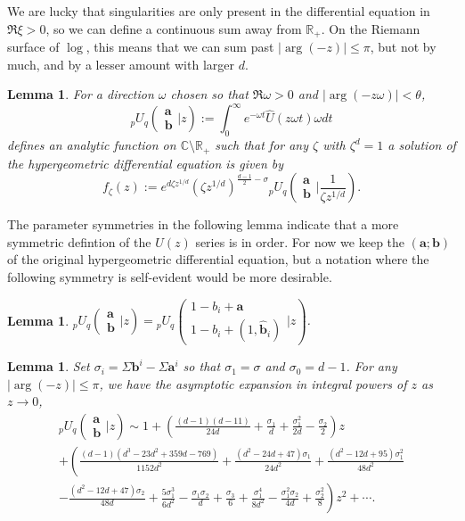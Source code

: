 \documentclass[12pt]{article}
\newcommand{\ee}[0] {e}
\numberwithin{equation}{section}
\newtheorem{lemma}[theorem]{Lemma}
\newcommand{\FF}[6] {{}_{#1}{#2}_{#3} \left( \begin{array}{c} #4 \\ #5 \end{array} \Big| #6  \right)}
\newcommand{\bfa}[0] {\mathbf{a}}
\newcommand{\bfb}[0] {\mathbf{b}}
\begin{document}
We are lucky that singularities are only present in the differential equation in $\Re \xi > 0$, so we can define a continuous sum away from $\mathbb{R}_{+}$. On the Riemann surface of $\log$, this means that we can sum past $|\arg(-z)|\le \pi$, but not by much, and by a lesser amount with larger $d$.

\begin{lemma}
\label{pUq_def}
For a direction $\omega$ chosen so that $\Re \omega > 0$ and $|\arg(-z \omega)| < \theta$,
\begin{equation*}
\FF{p}{U}{q}{\bfa}{\bfb}{z} := \int_{0}^{\infty} \ee^{-\omega t} \hat{U}(z \omega t) \omega dt
\end{equation*}
defines an analytic function on $\mathbb{C} \setminus \mathbb{R}_{+}$ such that for any $\zeta$ with $\zeta^d=1$ a solution of the hypergeometric differential equation is given by
\begin{equation*}
f_{\zeta}(z) := \ee^{d \zeta z^{1/d}} (\zeta z^{1/d})^{\frac{d-1}{2}-\sigma} \FF{p}{U}{q}{\bfa}{\bfb}{\frac{1}{\zeta z^{1/d}}}\text{.}
\end{equation*}
\end{lemma}
The parameter symmetries in the following lemma indicate that a more symmetric defintion of the $U(z)$ series is in order. For now we keep the $(\bfa ; \bfb)$ of the original hypergeometric differential equation, but a notation where the following symmetry is self-evident would be more desirable.
\begin{lemma}
\label{lemma_pUq_inv} $\FF{p}{U}{q}{\bfa}{\bfb}{z} = \FF{p}{U}{q}{1-b_i+\bfa}{1-b_i+(1,\hat{\bfb}_{i})}{z}$.
\end{lemma}

\begin{lemma}
Set $\sigma_i = \Sigma\bfb^i-\Sigma\bfa^i$ so that $\sigma_1 = \sigma$ and $\sigma_0 = d-1$. For any $|\arg(-z)| \le \pi$, we have the asymptotic expansion in integral powers of $z$ as $z \to 0$,
\begin{gather*}
\FF{p}{U}{q}{\bfa}{\bfb}{z} \sim 1+ \left(\frac{(d-1)(d-11)}{24 d}+\frac{\sigma _1}{d}+\frac{\sigma _1^2}{2
   d}-\frac{\sigma
   _2}{2}\right)z\\
+\left(\frac{(d-1)\left(d^3-23 d^2+359 d-769\right)}{1152 d^2} +\frac{\left(d^2-24 d+47\right) \sigma _1}{24d^2} + \frac{\left(d^2-12 d+95\right) \sigma _1^2}{48d^2} \right.\\
\left. -\frac{\left(d^2-12 d+47\right) \sigma_2}{48 d}+\frac{5\sigma_1^3}{6d^2}-\frac{\sigma_1 \sigma_2}{d}+\frac{\sigma_3}{6}+ \frac{\sigma _1^4}{8 d^2}-\frac{\sigma_1^2 \sigma _2}{4d}+\frac{\sigma
   _2^2}{8}\right)z^2+\cdots\text{.}
\end{gather*}
\end{lemma}
\end{document}
